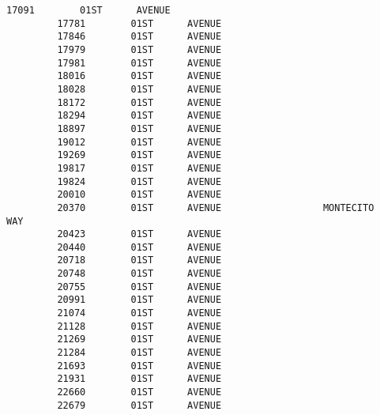 \documentclass[11pt]{article}
\begin{document}
\begin{Verbatim}[commandchars=\\\{\}]
         17091        01ST      AVENUE                                            
         17781        01ST      AVENUE                                            
         17846        01ST      AVENUE                                            
         17979        01ST      AVENUE                                            
         17981        01ST      AVENUE                                            
         18016        01ST      AVENUE                                            
         18028        01ST      AVENUE                                            
         18172        01ST      AVENUE                                            
         18294        01ST      AVENUE                                            
         18897        01ST      AVENUE                                            
         19012        01ST      AVENUE                                            
         19269        01ST      AVENUE                                            
         19817        01ST      AVENUE                                            
         19824        01ST      AVENUE                                            
         20010        01ST      AVENUE                                            
         20370        01ST      AVENUE                  MONTECITO           WAY   
         20423        01ST      AVENUE                                            
         20440        01ST      AVENUE                                            
         20718        01ST      AVENUE                                            
         20748        01ST      AVENUE                                            
         20755        01ST      AVENUE                                            
         20991        01ST      AVENUE                                            
         21074        01ST      AVENUE                                            
         21128        01ST      AVENUE                                            
         21269        01ST      AVENUE                                            
         21284        01ST      AVENUE                                            
         21693        01ST      AVENUE                                            
         21931        01ST      AVENUE                                            
         22660        01ST      AVENUE                                            
         22679        01ST      AVENUE                                            
         

\end{Verbatim}
\end{document}

